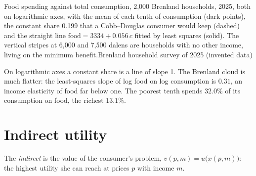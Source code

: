 \begin{omchart}{Food spending against total consumption, 2,000 Brenland
households, 2025, both on logarithmic axes, with the mean of each tenth of
consumption (dark points), the constant share 0.199 that a Cobb--Douglas
consumer would keep (dashed) and the straight line
$\text{food} = 3334 + 0.056\,c$ fitted by least squares
(solid). The vertical stripes at 6,000 and 7,500 dalens are households with no
other income, living on the minimum benefit.}{Brenland household survey of 2025 (invented data)}
\end{omchart}

On logarithmic axes a constant share is a line of slope 1. The Brenland
cloud is much flatter: the least-squares slope of log food on log
consumption is $0.31$, an income elasticity of food far below
one. %
The poorest tenth spends $32.0\%$ of its consumption on food, the richest
$13.1\%$. %

\section{Indirect utility}\label{sec:b1:consumer-choice:indirect}

\begin{definition}\label{def:b1:consumer-choice:indirect-utility}
The \emph{indirect } is the value of the consumer's
problem, $v(p, m) = u\bigl(x(p, m)\bigr)$: the highest utility she can reach at
prices $p$ with income $m$.
\end{definition}

